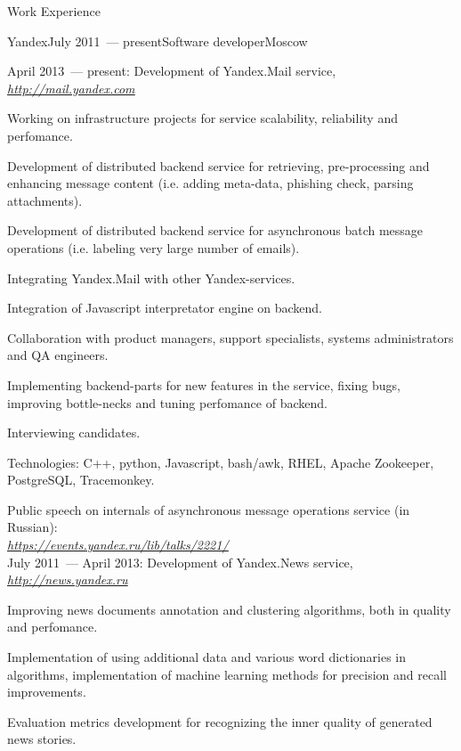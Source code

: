 \documentclass{resume} %
\newcommand{\hreftext}[1]{\underline{\textit{#1}}}
\begin{document}
\begin{rSection}{Work Experience}

\begin{rSubsection}{Yandex}{July 2011~--- present}{Software developer}{Moscow}

April 2013~--- present: Development of Yandex.Mail service, \href{http://mail.yandex.com}{\hreftext{http://mail.yandex.com}}
\item Working on infrastructure projects for service scalability, reliability and perfomance.
\item Development of distributed backend service for retrieving, pre-processing and enhancing message content (i.e. adding meta-data, phishing check, parsing attachments).
\item Development of distributed backend service for asynchronous batch message operations (i.e. labeling very large number of emails).
\item Integrating Yandex.Mail with other Yandex-services.
\item Integration of Javascript interpretator engine on backend.
\item Collaboration with product managers, support specialists, systems administrators and QA engineers. \item Implementing backend-parts for new features in the service, fixing bugs, improving bottle-necks and tuning perfomance of backend.
\item Interviewing candidates.
\item Technologies: C++, python, Javascript, bash/awk, RHEL, Apache Zookeeper, PostgreSQL, Tracemonkey.

Public speech on internals of asynchronous message operations service (in Russian): \\ \href{https://events.yandex.ru/lib/talks/2221/}{\hreftext{https://events.yandex.ru/lib/talks/2221/}}
\\ 

July 2011~--- April 2013: Development of Yandex.News service, \href{http://news.yandex.ru}{\hreftext{http://news.yandex.ru}}
\item Improving news documents annotation and clustering algorithms, both in quality and perfomance.

\item Implementation of using additional data and various word dictionaries in algorithms, implementation of machine learning methods for precision and recall improvements.

\item Evaluation metrics development for recognizing the inner quality of generated news stories.


\end{rSubsection}
\end{rSection}
\end{document}
